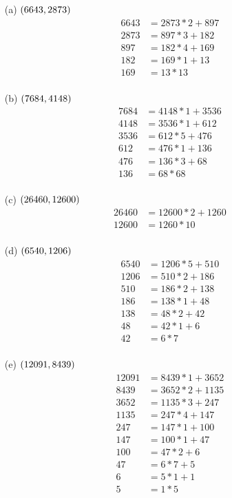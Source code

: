 \begin{mdframed}[style=darkAnswer,frametitle={Joe Starr}]
\begin{itemize}
    \item [(a)] {$\left(6643,2873\right)$
    \begin{align*}
        6643&=2873*2+897\\
        2873&=897*3+182\\
        897&=182*4+169\\
        182&=169*1+13\\
        169&=13*13\\
    \end{align*}
    }
    \item [(b)] {$\left(7684,4148\right)$
    \begin{align*}
        7684&=4148*1+3536\\
        4148&=3536*1+612\\
        3536&=612*5+476\\
        612&=476*1+136\\
        476&=136*3+68\\
        136&=68*68\\
    \end{align*}
    }
    \item [(c)] {$\left(26460,12600\right)$
    \begin{align*}
        26460&=12600*2+1260\\
        12600&=1260*10\\
    \end{align*}
    }
    \item [(d)] {$\left(6540,1206\right)$
    \begin{align*}
        6540&=1206*5+510\\
        1206&=510*2+186\\
        510&=186*2+138\\
        186&=138*1+48\\
        138&=48*2+42\\
        48&=42*1+6\\
        42&=6*7\\
    \end{align*}
    }
    \item [(e)] {$\left(12091,8439\right)$
    \begin{align*}
        12091&=8439*1+3652\\
        8439&=3652*2+1135\\
        3652&=1135*3+247\\
        1135&=247*4+147\\
        247&=147*1+100\\
        147&=100*1+47\\
        100&=47*2+6\\
        47&=6*7+5\\
        6&=5*1+1\\
        5&=1*5\\
    \end{align*}
    }
\end{itemize}
\end{mdframed}
